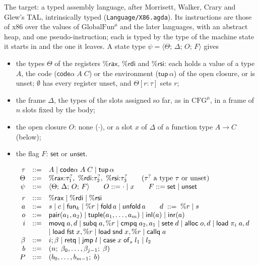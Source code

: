 \documentclass[10pt]{article}
\makeatletter
\theoremstyle{acmplain}
\newcommand{\key}[1]{\mathsf{#1}}
\newcommand{\funref}[1]{\key{fun}_{#1}}
\newcommand{\rax}{\%\key{rax}}
\newcommand{\rdi}{\%\key{rdi}}
\newcommand{\rsi}{\%\key{rsi}}
\newcommand{\Tst}[4]{\langle #1;\, #2;\, #3;\, #4 \rangle} %
\newcommand{\tupA}{\key{tup}\,\alpha}                     %
\newcommand{\Tset}{\key{set}}
\newcommand{\Tunset}{\key{unset}}
\newcommand{\Ml}[1]{\textrm{#1}^{\mu}}                  %
\newcommand{\Mfold}{\key{fold}\,}
\newcommand{\Munfold}{\key{unfold}\,}
\newcommand{\codeAB}[2]{\key{code}\alpha\;#1\;#2}         %
\newcommand{\Mxcase}[4]{\key{case}\;#1\;\key{of}_{#2}\;#3 \mid #4}  %
\newenvironment{syntax}{\[\begin{array}{l@{\quad}rcl}}{\end{array}\]}
\makeatother
\begin{document}
The target: a typed assembly language, after Morrisett, Walker, Crary and
Glew's TAL, intrinsically typed (\texttt{Language/X86.agda}). Its
instructions are those of x86 over the values of $\Ml{GlobalFun}$ and the
later languages, with an abstract heap, and one pseudo-instruction; each
is typed by the type of the machine state it starts in and the one it
leaves. A state type $\psi = \Tst{\Theta}{\Delta}{O}{F}$ gives
\begin{itemize}
\item the types $\Theta$ of the registers $\rax$, $\rdi$ and $\rsi$: each
  holds a value of a type $A$, the code ($\codeAB{A}{C}$) or the
  environment ($\tupA$) of the open closure, or is unset; $\emptyset$ has
  every register unset, and $\Theta[r{:}\tau]$ sets $r$;
\item the frame $\Delta$, the types of the slots assigned so far, as in
  $\Ml{CFG}$, in a frame of $n$ slots fixed by the body;
\item the open closure $O$: none ($\cdot$), or a slot $x$ of $\Delta$ of a
  function type $A \rightarrow C$ (below);
\item the flag $F$: $\Tset$ or $\Tunset$.
\end{itemize}
\begin{syntax}
  & \tau &::=& A \mid \codeAB{A}{C} \mid \tupA \\
  & \Theta &::=& \rax{:}\tau_1^?,\ \rdi{:}\tau_2^?,\ \rsi{:}\tau_3^?
    \qquad (\tau^? \text{ a type } \tau \text{ or unset}) \\
  & \psi &::=& \Tst{\Theta}{\Delta}{O}{F}
    \qquad O ::= \cdot \mid x \qquad F ::= \Tset \mid \Tunset \\[1ex]
  & r &::=& \rax \mid \rdi \mid \rsi \\
  & a &::=& s \mid c \mid \funref{k} \mid \%r \mid \Mfold a \mid \Munfold a
    \qquad d \;::=\; \%r \mid s \\
  & o &::=& \key{pair}(a_1, a_2) \mid \key{tuple}(a_1, \ldots, a_m) \mid \key{inl}(a) \mid \key{inr}(a) \\
  & i &::=& \key{movq}\; a, d \mid \key{subq}\; a, \%r \mid \key{cmpq}\; a_2, a_1
    \mid \key{sete}\; d \mid \key{alloc}\; o, d \mid \key{load}\; \pi_i\; a, d \\
  &&& \mid \key{load}\; \key{fst}\; x, \%r \mid \key{load}\; \key{snd}\; x, \%r
    \mid \key{callq}\; a \\
  & \beta &::=& i; \beta \mid \key{retq} \mid \key{jmp}\; l \mid \Mxcase{x}{s}{l_1}{l_2} \\
  & b &::=& (n;\; \beta_0, \ldots, \beta_{j-1};\; \beta) \\
  & P &::=& (b_0, \ldots, b_{m-1};\; b)
\end{syntax}
\end{document}
